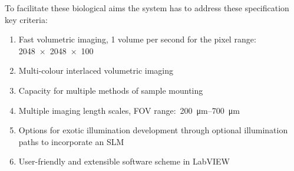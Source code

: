 To facilitate these biological aims the system has to address these specification key criteria:

\begin{enumerate}
    \item Fast volumetric imaging, 1 volume per second for the pixel range:\\\SI{2048x2048x100}{}\label{item:volumes}
    \item Multi-colour interlaced volumetric imaging\label{item:colour}
    \item Capacity for multiple methods of sample mounting\label{item:mounting}
    \item Multiple imaging length scales, \gls{FOV} range:~\SIrange{200}{700}{\micro\meter}\label{item:scales}%
    \item Options for exotic illumination development through optional illumination paths to incorporate an \gls{SLM}\label{item:illumination}
    \item User-friendly and extensible software scheme in \gls{LabVIEW}\label{item:software}
\end{enumerate}

%
%
%
%
%

